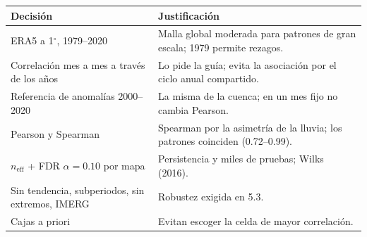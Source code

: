 \documentclass[11pt,letterpaper]{article}
\begin{document}
\begin{table}[H]
\centering\small
\begin{tabularx}{\textwidth}{l X}
\toprule
Decisión & Justificación \\
\midrule
ERA5 a 1$^\circ$, 1979--2020 & Malla global moderada para patrones de gran escala; 1979 permite rezagos. \\
Correlación mes a mes a través de los años & Lo pide la guía; evita la asociación por el ciclo anual compartido. \\
Referencia de anomalías 2000--2020 & La misma de la cuenca; en un mes fijo no cambia Pearson. \\
Pearson y Spearman & Spearman por la asimetría de la lluvia; los patrones coinciden (0.72--0.99). \\
$n_\mathrm{eff}$ + FDR $\alpha=0.10$ por mapa & Persistencia y miles de pruebas; Wilks (2016). \\
Sin tendencia, subperiodos, sin extremos, IMERG & Robustez exigida en 5.3. \\
Cajas a priori & Evitan escoger la celda de mayor correlación. \\
\bottomrule
\end{tabularx}
\end{table}
\end{document}
